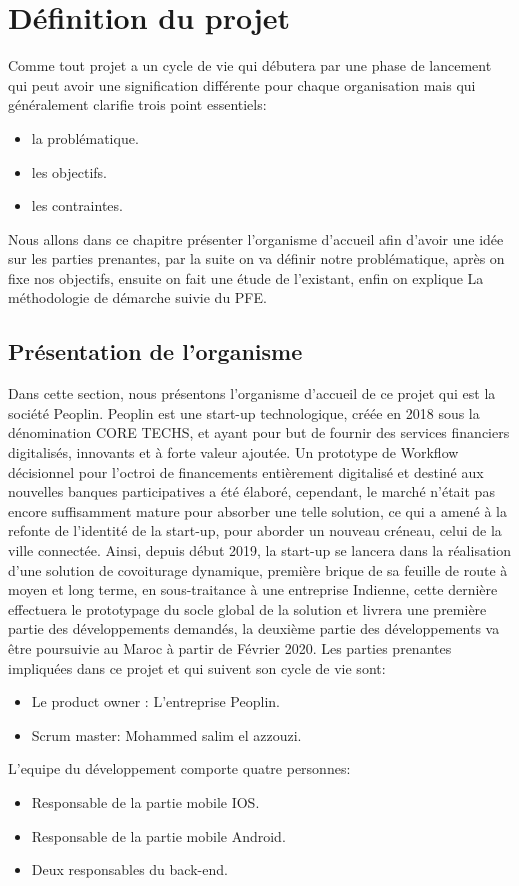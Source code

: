 \chapter{Définition du projet}

Comme tout projet a un cycle de vie qui débutera par une phase de lancement qui peut avoir une signification différente pour chaque organisation mais qui généralement clarifie trois point essentiels:
\begin{itemize}
	\item la problématique.
	\item les objectifs.
	\item les contraintes.
\end{itemize}
Nous allons dans ce chapitre présenter l'organisme d’accueil afin d'avoir une idée sur les parties prenantes, par la suite on va définir notre problématique, après on fixe nos objectifs, ensuite on fait une étude de l'existant, enfin on explique La méthodologie de démarche suivie du PFE.


\section{Présentation de l’organisme}

Dans cette section, nous présentons l’organisme d’accueil de ce projet qui est la société Peoplin.\newline
Peoplin est une start-up technologique, créée en 2018 sous la dénomination CORE TECHS, et ayant pour but de fournir des services financiers digitalisés, innovants et à forte valeur ajoutée. Un prototype de Workflow décisionnel pour l’octroi de financements entièrement digitalisé et destiné aux nouvelles banques participatives a été élaboré, cependant, le marché n’était pas encore suffisamment mature pour absorber une telle solution, ce qui a amené à la refonte de l’identité de la start-up, pour aborder un nouveau créneau, celui de la ville connectée.\newline 
Ainsi, depuis début 2019, la start-up se lancera dans la réalisation d’une solution de covoiturage dynamique, première brique de sa feuille de route à moyen et long terme, en sous-traitance à une entreprise Indienne, cette dernière effectuera le prototypage du socle global de la solution et livrera une première partie des développements demandés, la deuxième partie des développements va être poursuivie au Maroc à partir de Février 2020.\newline
Les parties prenantes impliquées dans ce projet et qui suivent son cycle de vie sont: 
\begin{itemize}
	\item Le product owner : L’entreprise Peoplin.
	\item Scrum master: Mohammed salim el azzouzi.
\end{itemize}
L'equipe du développement comporte quatre personnes:
\begin{itemize}
	\item Responsable de la partie mobile IOS.
	\item Responsable de la partie mobile Android.
	\item Deux responsables du back-end.
\end{itemize}

